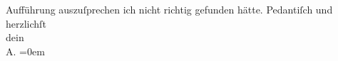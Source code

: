 \begin{ledgroupsized}[t]{13cm}
               Aufführung auszuſprechen ich nicht richtig gefunden hätte.\pend
           \pstart
           Pedantiſch und herzlichſt{\\[\baselineskip]}dein{\\[\baselineskip]}\spacefill\mbox{A}.\pend
           \leftskip=0em{}\endnumbering{}\end{ledgroupsized}  \newcommand{\dateiname}{L01982}\newcommand{\titel}{Arthur Schnitzler an Hermann Bahr, 19. 11. 1910}\newcommand{\editorInnen}{ Kurt Ifkovits,  Martin Anton Müller}
      